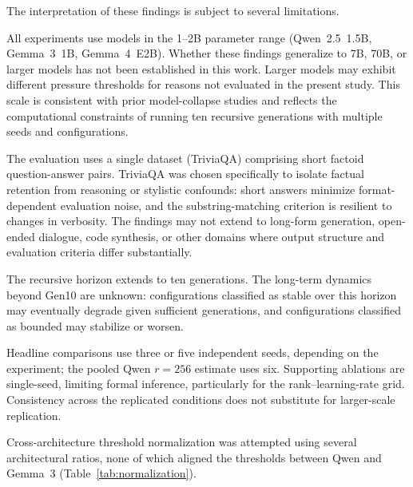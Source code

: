 \documentclass[a4paper,fleqn]{cas-dc}
\newif\ifshowchanges
\newcommand{\rev}[1]{\ifshowchanges{\color{blue}#1}\else{#1}\fi}
\begin{document}
The interpretation of these findings is subject to several limitations.

All experiments use models in the 1--2B parameter range (Qwen~2.5~1.5B,
Gemma~3~1B, Gemma~4~E2B). Whether these findings generalize to 7B, 70B, or
larger models has not been established in this work. Larger models may exhibit
different pressure thresholds for reasons not evaluated in the present study.
This scale is consistent with prior model-collapse studies
\citep{shumailov2024,keisha2025} and reflects the computational constraints of
running ten recursive generations with multiple seeds and configurations.

The evaluation uses a single dataset (TriviaQA) comprising short factoid
question-answer pairs. TriviaQA was chosen specifically to isolate factual
retention from reasoning or stylistic confounds: short answers minimize
format-dependent evaluation noise, and the substring-matching criterion is
resilient to changes in verbosity. The findings may not extend to long-form
generation, open-ended dialogue, code synthesis, or other domains where output
structure and evaluation criteria differ substantially.

The recursive horizon extends to ten generations. The long-term dynamics beyond
Gen10 are unknown: configurations classified as stable over this horizon
may eventually degrade given sufficient generations, and configurations
classified as bounded may stabilize or worsen.

Headline comparisons use three or five independent seeds, depending on
the experiment; the pooled Qwen $r=256$ estimate uses six. \rev{Supporting
ablations are single-seed, limiting formal inference, particularly for
the rank--learning-rate grid. Consistency across the replicated
conditions does not substitute for larger-scale replication.}

Cross-architecture threshold normalization was attempted using several
architectural ratios, none of which aligned the thresholds between Qwen and
Gemma~3 (Table~\ref{tab:normalization}).
\end{document}
